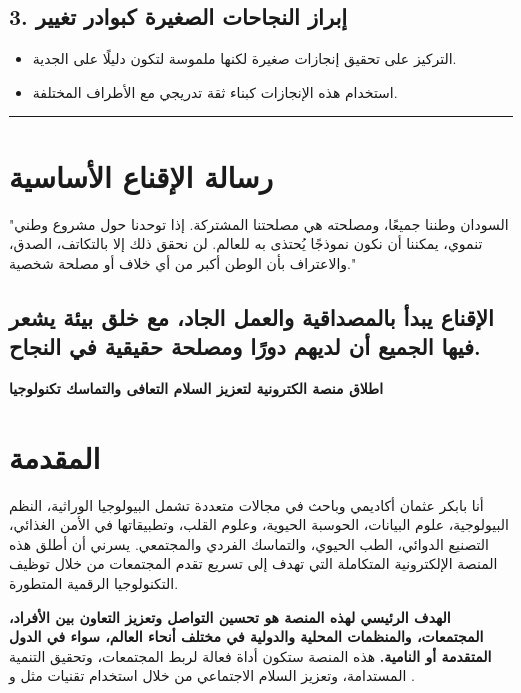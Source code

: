 \documentclass[12pt]{article}
\begin{document}
\subsection{3. إبراز النجاحات الصغيرة كبوادر تغيير}
\begin{itemize}
    \item التركيز على تحقيق إنجازات صغيرة لكنها ملموسة لتكون دليلًا على الجدية.
    \item استخدام هذه الإنجازات كبناء ثقة تدريجي مع الأطراف المختلفة.
\end{itemize}

\hrule

\section{رسالة الإقناع الأساسية}
"السودان وطننا جميعًا، ومصلحته هي مصلحتنا المشتركة. إذا توحدنا حول مشروع وطني تنموي، يمكننا أن نكون نموذجًا يُحتذى به للعالم. لن نحقق ذلك إلا بالتكاتف، الصدق، والاعتراف بأن الوطن أكبر من أي خلاف أو مصلحة شخصية."

\subsection{الإقناع يبدأ بالمصداقية والعمل الجاد، مع خلق بيئة يشعر فيها الجميع أن لديهم دورًا ومصلحة حقيقية في النجاح.}




\newpage  


\begin{center}                       {\Huge\textbf{\textcolor{titleColor}{ اطلاق منصة الكترونية لتعزيز السلام التعافى والتماسك تكنولوجيا }}}         
\end{center}
	\vspace{0.5cm}


\section {\textcolor{sectionColor}{المقدمة}}
أنا بابكر عثمان أكاديمي وباحث في مجالات متعددة تشمل البيولوجيا الوراثية، النظم البيولوجية، علوم البيانات، الحوسبة الحيوية، وعلوم القلب، وتطبيقاتها في الأمن الغذائي، التصنيع الدوائي، الطب الحيوي، والتماسك الفردي والمجتمعي. يسرني أن أطلق هذه المنصة الإلكترونية المتكاملة التي تهدف إلى تسريع تقدم المجتمعات من خلال توظيف التكنولوجيا الرقمية المتطورة.

\textbf{الهدف الرئيسي لهذه المنصة هو تحسين التواصل وتعزيز التعاون بين الأفراد، المجتمعات، والمنظمات المحلية والدولية في مختلف أنحاء العالم، سواء في الدول المتقدمة أو النامية.} هذه المنصة ستكون أداة فعالة لربط المجتمعات، وتحقيق التنمية المستدامة، وتعزيز السلام الاجتماعي من خلال استخدام تقنيات مثل  و .
\end{document}
